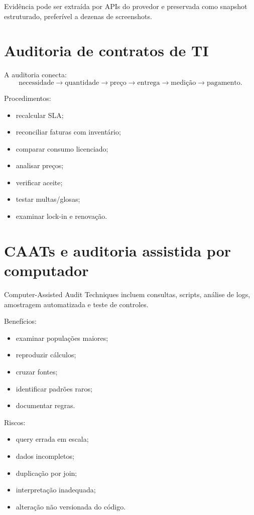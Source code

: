 Evidência pode ser extraída por APIs do provedor e preservada como snapshot estruturado, preferível a dezenas de screenshots.

\section{Auditoria de contratos de TI}

A auditoria conecta:
\[
\text{necessidade}\rightarrow
\text{quantidade}\rightarrow
\text{preço}\rightarrow
\text{entrega}\rightarrow
\text{medição}\rightarrow
\text{pagamento}.
\]

Procedimentos:
\begin{itemize}
\item recalcular SLA;
\item reconciliar faturas com inventário;
\item comparar consumo licenciado;
\item analisar preços;
\item verificar aceite;
\item testar multas/glosas;
\item examinar lock-in e renovação.
\end{itemize}

\section{CAATs e auditoria assistida por computador}

Computer-Assisted Audit Techniques incluem consultas, scripts, análise de logs, amostragem automatizada e teste de controles.

Benefícios:
\begin{itemize}
\item examinar populações maiores;
\item reproduzir cálculos;
\item cruzar fontes;
\item identificar padrões raros;
\item documentar regras.
\end{itemize}

Riscos:
\begin{itemize}
\item query errada em escala;
\item dados incompletos;
\item duplicação por join;
\item interpretação inadequada;
\item alteração não versionada do código.
\end{itemize}

